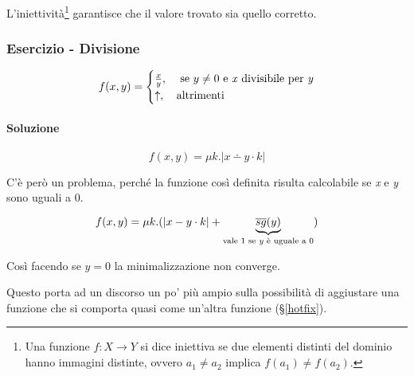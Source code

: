 L'iniettività\footnote{Una funzione $ f: X\rightarrow Y $ si dice iniettiva se due elementi distinti del dominio hanno immagini distinte, ovvero $a_1\neq a_2$ implica $f(a_1)\neq f(a_2)$.} garantisce che il valore trovato sia quello corretto.


\subsubsection{Esercizio - Divisione}

$$
f(x,y) = \begin{cases}
\frac{x}{y}, &\text{ se } y \neq 0 \text{ e \textit{x} divisibile per \textit{y}}\\
\uparrow, &\text{altrimenti} 
\end{cases}
$$

\paragraph{Soluzione}

$$
f(x,y) = \mu k. |x \dotminus y\cdot k|
$$

C'è però un problema, perché la funzione così definita risulta calcolabile se \textit{x} e \textit{y} sono uguali a 0.

$$
f(x,y) = \mu k.(|x - y\cdot k| + \underbrace{\overline{sg}(y)}_{\text{vale 1 se \textit{y} è uguale a 0}})
$$

Così facendo se $ y=0 $ la minimalizzazione non converge.

Questo porta ad un discorso un po' più ampio sulla possibilità di aggiustare una funzione che si comporta quasi come un'altra funzione (§\ref{hotfix}).
